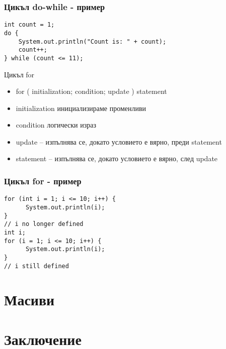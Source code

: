 \documentclass{beamer}
\begin{document}
\begin{frame}[fragile]
  \frametitle{Цикъл do-while - пример}
\begin{lstlisting}
int count = 1;
do {
    System.out.println("Count is: " + count);
    count++;
} while (count <= 11);
\end{lstlisting}
\end{frame}

\begin{frame}{Цикъл for}
  \begin{itemize}
  \item   for ( initialization; condition; update )  {statement}
    \item initialization инициализираме променливи
    \item condition логически израз
    \item update – изпълнява се, докато
    условието е вярно, преди statement

    \item statement – изпълнява се, докато
    условието е вярно, след update

  \end{itemize}
\end{frame}

\begin{frame}[fragile]
  \frametitle{Цикъл for - пример}
\begin{lstlisting}
for (int i = 1; i <= 10; i++) {
      System.out.println(i);
}
// i no longer defined
int i;
for (i = 1; i <= 10; i++) {
      System.out.println(i);
}
// i still defined
\end{lstlisting}
\end{frame}


\section{Масиви}

\section*{Заключение}
\end{document}
